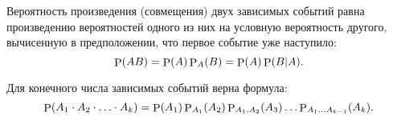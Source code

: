 \begin{to_thr}[]
    Вероятность произведения (совмещения) двух зависимых событий равна произведению вероятностей одного из них на условную вероятность другого, вычисенную в предположении, что первое событие уже наступило:
    \begin{equation*}
        \P(AB) = \P(A) \P_A(B) = \P(A) \P(B|A).
    \end{equation*}
\end{to_thr}

\begin{to_con}
    Для конечного числа зависимых событий верна формула:
    \begin{equation*}
        \P(A_1 \cdot A_2 \cdot \ldots \cdot A_k) = \P(A_1) \P_{A_1} (A_2) \P_{A_1, A_2} (A_3) \ldots \P_{A_1 \ldots A_{k-1}} (A_k).
    \end{equation*}
\end{to_con}